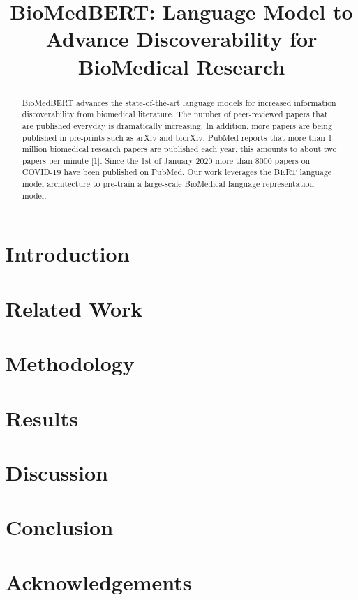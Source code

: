\documentclass{article}
\title{BioMedBERT: Language Model to Advance Discoverability for BioMedical Research}
\author{
}
\begin{document}
\maketitle
\begin{abstract}
BioMedBERT advances the state-of-the-art language models for increased information discoverability from biomedical literature. The number of peer-reviewed papers that are published everyday is dramatically increasing. In addition, more papers are being published in pre-prints such as arXiv and biorXiv. PubMed reports that more than 1 million biomedical research papers are published each year, this amounts to about two papers per minute [1]. Since the 1st of January 2020 more than 8000 papers on COVID-19 have been published on PubMed. Our work leverages the BERT language model architecture to pre-train a large-scale BioMedical language representation model. 
\end{abstract}




\section{Introduction}



\section{Related Work}


\section{Methodology}


\section{Results}


\section{Discussion}


\section{Conclusion}


\section{Acknowledgements}
\end{document}
